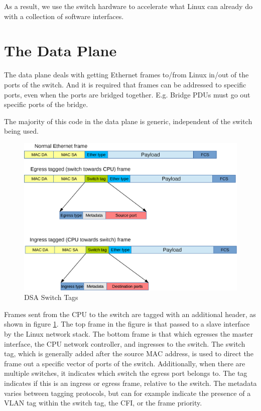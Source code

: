 \documentclass[letterpaper]{article}
\begin{document}
As a result, we use the switch hardware to accelerate what Linux can
already do with a collection of software interfaces.

\section{The Data Plane}

The data plane deals with getting Ethernet frames to/from Linux in/out
of the ports of the switch. And it is required that frames can be
addressed to specific ports, even when the ports are bridged together.
E.g. Bridge PDUs must go out specific ports of the bridge.

The majority of this code in the data plane is generic, independent of
the switch being used.

\begin{figure}[ht]
  \centering
  \includegraphics[width=\columnwidth]{DSA-frame-processing.eps}
  \caption{DSA Switch Tags}
  \label{DSA-frame-processing}
\end{figure}

Frames sent from the CPU to the switch are tagged with an additional
header, as shown in figure \ref{DSA-frame-processing}. The top frame
in the figure is that passed to a slave interface by the Linux network
stack. The bottom frame is that which egresses the master interface,
the CPU network controller, and ingresses to the switch. The switch
tag, which is generally added after the source MAC address, is used to
direct the frame out a specific vector of ports of the switch.
Additionally, when there are multiple switches, it indicates which
switch the egress port belongs to. The tag indicates if this is an
ingress or egress frame, relative to the switch. The metadata varies
between tagging protocols, but can for example indicate the presence
of a VLAN tag within the switch tag, the CFI, or the frame priority.
\end{document}
